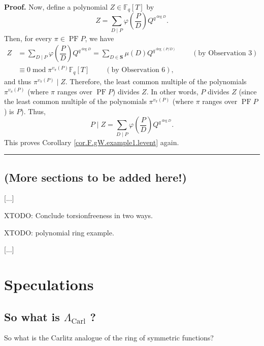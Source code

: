 \documentclass[numbers=enddot,12pt,final,onecolumn,notitlepage]{scrartcl}%
\theoremstyle{definition}
\newenvironment{proof}[1][Proof]{\noindent\textbf{#1.} }{\ \rule{0.5em}{0.5em}}
\let\sumnonlimits\sum
\renewcommand{\sum}{\sumnonlimits\limits}
\begin{document}
\begin{proof}
Now, define a polynomial $Z\in\mathbb{F}_{q}\left[  T\right]  $ by%
\[
Z=\sum_{D\mid P}\varphi\left(  \dfrac{P}{D}\right)  Q^{q^{\deg D}}.
\]
Then, for every $\pi\in\operatorname*{PF}P$, we have%
\begin{align*}
Z  &  =\sum_{D\mid P}\varphi\left(  \dfrac{P}{D}\right)  Q^{q^{\deg D}}%
=\sum_{D\in\mathbf{S}}\mu\left(  D\right)  Q^{q^{\deg\left(  P/D\right)  }%
}\ \ \ \ \ \ \ \ \ \ \left(  \text{by Observation 3}\right) \\
&  \equiv0\operatorname{mod}\pi^{v_{\pi}\left(  P\right)  }\mathbb{F}%
_{q}\left[  T\right]  \ \ \ \ \ \ \ \ \ \ \left(  \text{by Observation
6}\right)  ,
\end{align*}
and thus $\pi^{v_{\pi}\left(  P\right)  }\mid Z$. Therefore, the least common
multiple of the polynomials $\pi^{v_{\pi}\left(  P\right)  }$ (where $\pi$
ranges over $\operatorname*{PF}P$) divides $Z$. In other words, $P$ divides
$Z$ (since the least common multiple of the polynomials $\pi^{v_{\pi}\left(
P\right)  }$ (where $\pi$ ranges over $\operatorname*{PF}P$) is $P$). Thus,%
\[
P\mid Z=\sum_{D\mid P}\varphi\left(  \dfrac{P}{D}\right)  Q^{q^{\deg D}}.
\]
This proves Corollary \ref{cor.F.gW.example1.levent} again.
\end{proof}

\subsection{(More sections to be added here!)}

[...]

XTODO: Conclude torsionfreeness in two ways.

XTODO: polynomial ring example.

[...]

\section{\label{sect.tinfoil}Speculations}

\subsection{So what is $\Lambda_{\operatorname*{Carl}}$ ?}

So what is the Carlitz analogue of the ring of symmetric functions?
\end{document}
